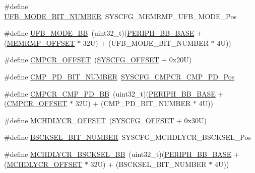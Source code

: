 \begin{DoxyCompactItemize}
\#define \hyperlink{group___h_a_l___private___constants_gac8a0079a8d30ec8633adaed9e2cfa49d}{U\+F\+B\+\_\+\+M\+O\+D\+E\+\_\+\+B\+I\+T\+\_\+\+N\+U\+M\+B\+ER}~S\+Y\+S\+C\+F\+G\+\_\+\+M\+E\+M\+R\+M\+P\+\_\+\+U\+F\+B\+\_\+\+M\+O\+D\+E\+\_\+\+Pos
\item 
\#define \hyperlink{group___h_a_l___private___constants_ga96bde9109ea6ea0a7887658669ff9221}{U\+F\+B\+\_\+\+M\+O\+D\+E\+\_\+\+BB}~(uint32\+\_\+t)(\hyperlink{group___peripheral__memory__map_gaed7efc100877000845c236ccdc9e144a}{P\+E\+R\+I\+P\+H\+\_\+\+B\+B\+\_\+\+B\+A\+SE} + (\hyperlink{group___h_a_l___private___constants_ga7f801653c361f31380f21357f92dc9af}{M\+E\+M\+R\+M\+P\+\_\+\+O\+F\+F\+S\+ET} $\ast$ 32\+U) + (\+U\+F\+B\+\_\+\+M\+O\+D\+E\+\_\+\+B\+I\+T\+\_\+\+N\+U\+M\+B\+E\+R $\ast$ 4\+U))
\item 
\#define \hyperlink{group___h_a_l___private___constants_ga8e5fbe846e7478d522df749672b90084}{C\+M\+P\+C\+R\+\_\+\+O\+F\+F\+S\+ET}~(\hyperlink{group___h_a_l___private___constants_ga13f7abe3641989d4d063ad21962da8b0}{S\+Y\+S\+C\+F\+G\+\_\+\+O\+F\+F\+S\+ET} + 0x20\+U)
\item 
\#define \hyperlink{group___h_a_l___private___constants_ga9e34adb28e3eed088c55766f72d53183}{C\+M\+P\+\_\+\+P\+D\+\_\+\+B\+I\+T\+\_\+\+N\+U\+M\+B\+ER}~\hyperlink{group___peripheral___registers___bits___definition_gad1747204ad5b1221e47a6610e46790e9}{S\+Y\+S\+C\+F\+G\+\_\+\+C\+M\+P\+C\+R\+\_\+\+C\+M\+P\+\_\+\+P\+D\+\_\+\+Pos}
\item 
\#define \hyperlink{group___h_a_l___private___constants_gae4516ed27e02d84d9d20c7d711b87437}{C\+M\+P\+C\+R\+\_\+\+C\+M\+P\+\_\+\+P\+D\+\_\+\+BB}~(uint32\+\_\+t)(\hyperlink{group___peripheral__memory__map_gaed7efc100877000845c236ccdc9e144a}{P\+E\+R\+I\+P\+H\+\_\+\+B\+B\+\_\+\+B\+A\+SE} + (\hyperlink{group___h_a_l___private___constants_ga8e5fbe846e7478d522df749672b90084}{C\+M\+P\+C\+R\+\_\+\+O\+F\+F\+S\+ET} $\ast$ 32\+U) + (\+C\+M\+P\+\_\+\+P\+D\+\_\+\+B\+I\+T\+\_\+\+N\+U\+M\+B\+E\+R $\ast$ 4\+U))
\item 
\#define \hyperlink{group___h_a_l___private___constants_ga41f6d93357082d3177da0e85b872b6cf}{M\+C\+H\+D\+L\+Y\+C\+R\+\_\+\+O\+F\+F\+S\+ET}~(\hyperlink{group___h_a_l___private___constants_ga13f7abe3641989d4d063ad21962da8b0}{S\+Y\+S\+C\+F\+G\+\_\+\+O\+F\+F\+S\+ET} + 0x30\+U)
\item 
\#define \hyperlink{group___h_a_l___private___constants_gaf2471142b1e018bc470cf8d8c39ade4b}{B\+S\+C\+K\+S\+E\+L\+\_\+\+B\+I\+T\+\_\+\+N\+U\+M\+B\+ER}~S\+Y\+S\+C\+F\+G\+\_\+\+M\+C\+H\+D\+L\+Y\+C\+R\+\_\+\+B\+S\+C\+K\+S\+E\+L\+\_\+\+Pos
\item 
\#define \hyperlink{group___h_a_l___private___constants_gaf57f0bab14ecc4fa67651617a3bed337}{M\+C\+H\+D\+L\+Y\+C\+R\+\_\+\+B\+S\+C\+K\+S\+E\+L\+\_\+\+BB}~(uint32\+\_\+t)(\hyperlink{group___peripheral__memory__map_gaed7efc100877000845c236ccdc9e144a}{P\+E\+R\+I\+P\+H\+\_\+\+B\+B\+\_\+\+B\+A\+SE} + (\hyperlink{group___h_a_l___private___constants_ga41f6d93357082d3177da0e85b872b6cf}{M\+C\+H\+D\+L\+Y\+C\+R\+\_\+\+O\+F\+F\+S\+ET} $\ast$ 32\+U) + (\+B\+S\+C\+K\+S\+E\+L\+\_\+\+B\+I\+T\+\_\+\+N\+U\+M\+B\+E\+R $\ast$ 4\+U))
\end{DoxyCompactItemize}


